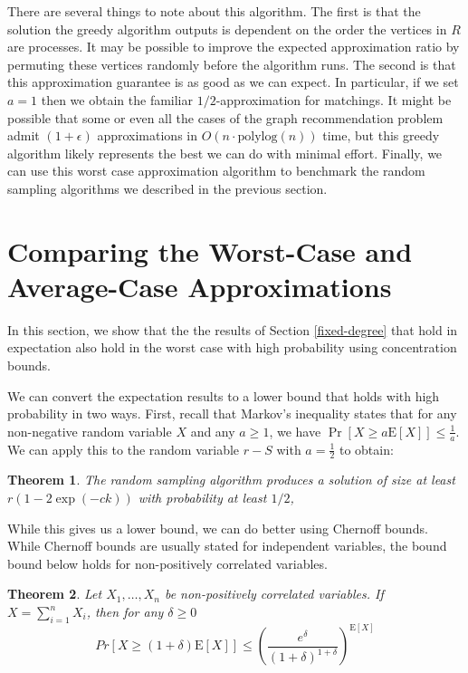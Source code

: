 \documentclass[]{article}
\newcommand{\E}{\text{E}}
\newtheorem{thm}{Theorem}
\begin{document}
There are several things to note about this algorithm. The first is
that the solution the greedy algorithm outputs is dependent on the
order the vertices in $R$ are processes. It may be possible to improve
the expected approximation ratio by permuting these vertices randomly
before the algorithm runs. The second is that this approximation
guarantee is as good as we can expect. In particular, if we set $a=1$
then we obtain the familiar $1/2$-approximation for matchings. It
might be possible that some or even all the cases of the graph
recommendation problem admit $(1+\epsilon)$ approximations in
$O(n\cdot \text{polylog}(n))$ time, but this greedy algorithm likely
represents the best we can do with minimal effort. Finally, we can use
this worst case approximation algorithm to benchmark the random
sampling algorithms we described in the previous section.

\label{worst-vs-avg}
\section{Comparing the Worst-Case and Average-Case Approximations}
In this section, we show that the the results of Section
\ref{fixed-degree} that hold in expectation also hold in the worst
case with high probability using concentration bounds.

We can convert the expectation results to a lower bound that holds
with high probability in two ways. First, recall that Markov's
inequality states that for any non-negative random variable $X$ and
any $a\geq 1$, we have $\Pr[X \geq a\E[X]] \leq \frac{1}{a}$. We can
apply this to the random variable $r-S$ with $a=\frac{1}{2}$ to
obtain:

\begin{thm}
The random sampling algorithm produces a solution of size at least $r(1-2\exp(-ck))$ with probability at least $1/2$, 
\end{thm}

While this gives us a lower bound, we can do better using Chernoff
bounds. While Chernoff bounds are usually stated for independent
variables, the bound bound below holds for non-positively correlated
variables.

\begin{thm}
Let $X_1,\ldots, X_n$ be non-positively correlated variables. If $X=\sum_{i=1}^n X_i$, then for any $\delta\geq 0$
\[ Pr[X \geq (1+\delta)\E[X] ] \leq \left(\frac{e^\delta}{(1+\delta)^{1+\delta}}\right)^{\E[X]} \]
\end{thm}
\end{document}
